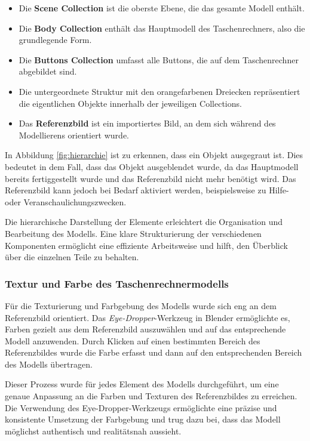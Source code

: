 \begin{itemize}
    \item Die \textbf{Scene Collection} ist die oberste Ebene, die das gesamte Modell enthält.
    \item Die \textbf{Body Collection} enthält das Hauptmodell des Taschenrechners, also die grundlegende Form.
    \item Die \textbf{Buttons Collection} umfasst alle Buttons, die auf dem Taschenrechner abgebildet sind.
    \item Die untergeordnete Struktur mit den orangefarbenen Dreiecken repräsentiert die eigentlichen Objekte innerhalb der jeweiligen Collections.
    \item Das \textbf{Referenzbild} ist ein importiertes Bild, an dem sich während des Modellierens orientiert wurde.
\end{itemize}

In Abbildung \ref{fig:hierarchie} ist zu erkennen, dass ein Objekt ausgegraut ist. Dies bedeutet in dem Fall, dass das
Objekt ausgeblendet wurde, da das Hauptmodell bereits fertiggestellt wurde und das Referenzbild nicht mehr benötigt wird.
Das Referenzbild kann jedoch bei Bedarf aktiviert werden, beispielsweise zu Hilfe- oder Veranschaulichungszwecken.

Die hierarchische Darstellung der Elemente erleichtert die Organisation und Bearbeitung des Modells. Eine klare
Strukturierung der verschiedenen Komponenten ermöglicht eine effiziente Arbeitsweise und hilft, den Überblick über die
einzelnen Teile zu behalten.

\subsubsection*{Textur und Farbe des Taschenrechnermodells}
Für die Texturierung und Farbgebung des Modells wurde sich eng an dem Referenzbild orientiert.
Das \textit{Eye-Dropper}-Werkzeug in Blender ermöglichte es, Farben gezielt aus dem Referenzbild auszuwählen und auf das
entsprechende Modell anzuwenden. Durch Klicken auf einen bestimmten Bereich des Referenzbildes wurde die Farbe erfasst
und dann auf den entsprechenden Bereich des Modells übertragen.

Dieser Prozess wurde für jedes Element des Modells durchgeführt, um eine genaue Anpassung an die Farben und Texturen
des Referenzbildes zu erreichen. Die Verwendung des Eye-Dropper-Werkzeugs ermöglichte eine präzise und konsistente
Umsetzung der Farbgebung und trug dazu bei, dass das Modell möglichst authentisch und realitätsnah aussieht.

